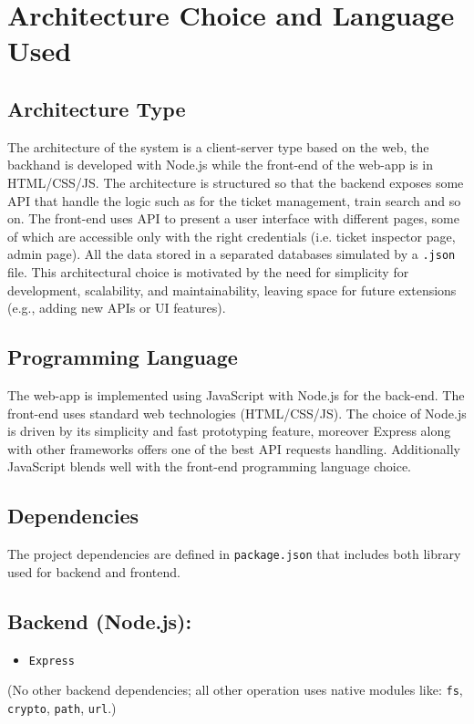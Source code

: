 \documentclass{article}
\begin{document}
\section{Architecture Choice and Language Used}
\subsection{Architecture Type}
The architecture of the system is a client-server type based on the web, the backhand is developed with Node.js while the front-end of the web-app is in HTML/CSS/JS. The architecture is structured so that the backend exposes some API that handle the logic such as for the ticket management, train search and so on. The front-end uses API to present a user interface with different pages, some of which are accessible only with the right credentials (i.e. ticket inspector page, admin page). All the data stored in a separated databases simulated by a \texttt{.json} file. This architectural choice is motivated by the need for simplicity for development, scalability, and maintainability, leaving space for future extensions (e.g., adding new APIs or UI features).  

\subsection{Programming Language}
The web-app is implemented using JavaScript with Node.js for the back-end. The front-end uses standard web technologies (HTML/CSS/JS). The choice of Node.js is driven by its simplicity and fast prototyping feature, moreover Express along with other frameworks offers one of the best API requests handling. Additionally JavaScript blends well with the front-end  programming language choice. 

\subsection{Dependencies}
The project dependencies are defined in \texttt{package.json} that includes both library used for backend and  frontend.

\subsection*{Backend (Node.js):}
\begin{itemize}
    \item \texttt{Express}
\end{itemize}
(No other backend dependencies; all other operation uses native modules like: \texttt{fs}, \texttt{crypto}, \texttt{path}, \texttt{url}.)
\end{document}
